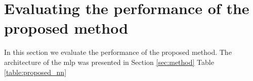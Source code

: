 \section{Evaluating the performance of the proposed method}
\label{sec:rul_eval}

In this section we evaluate the performance of the proposed method. The architecture of the \gls{mlp} was presented in Section \ref{sec:method} Table \ref{table:proposed_nn} 

